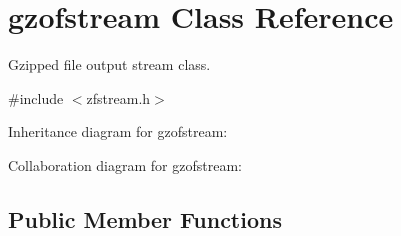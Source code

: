 \hypertarget{classgzofstream}{\section{gzofstream Class Reference}
\label{classgzofstream}
}


Gzipped file output stream class.  




{\ttfamily \#include $<$zfstream.\+h$>$}



Inheritance diagram for gzofstream\+:


Collaboration diagram for gzofstream\+:
\subsection*{Public Member Functions}
